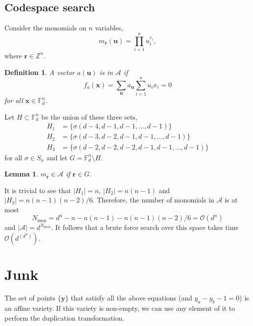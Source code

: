 \documentclass[11pt,a4paper]{article}
\newtheorem{definition}{Definition}
\newtheorem{lemma}{Lemma}
\begin{document}
	\subsection{Codespace search}
	Consider the monomials on $n$ variables,
	\begin{equation}
	m_{\mathbf{r}}(\mathbf{u}) = \prod_{i=1}^{n}u_i^{r_i},
	\end{equation}
	where $\mathbf{r} \in \mathbb{Z}^n$.
	\begin{definition}
		A vector $a(\mathbf{u})$ is in $\mathcal{A}$ if 
		\begin{equation}
		f_a(\mathbf{x}) = \sum_{\mathbf{u}}a_{\mathbf{u}}\sum_{i=1}^{n}u_ix_i = 0
		\end{equation}
		for all $\mathbf{x} \in \mathbb{F}_d^n$.
	\end{definition}		
	Let $H \subset \mathbb{F}_d^n$ be the union of these three sets,
	\begin{align}
	H_1 &= \{\sigma(d-4, d-1, d-1, \dots, d-1)\}\\	
	H_2 &= \{\sigma(d-3, d-2, d-1, d-1, \dots, d-1) \}\\
	H_3 &= \{\sigma(d-2, d-2, d-2, d-1, d-1, \dots, d-1) \}
	\end{align}
	for all $\sigma \in S_n$ and let $G = \mathbb{F}_d^n \setminus H$.
	
	\begin{lemma}
		$m_{\mathbf{r}}\in \mathcal{A}$ if $\mathbf{r} \in G$.
	\end{lemma}

 	It is trivial to see that $|H_1| = n$, $|H_2| = n(n-1)$ and $|H_3| = n(n-1)(n-2)/6$. Therefore, the number of monomials in $\mathcal{A}$ is at most
 	\begin{equation}
 	N_{\mathrm{mon}} = d^n - n - n(n-1) - n(n-1)(n-2)/6 = \mathcal{O}(d^n)
 	\end{equation}
 	and $|\mathcal{A}|=d^{N_{\mathrm{mon}}}$. It follows that a brute force search over this space takes time $\mathcal{O}(d^{(d^n)})$.
 	
 	\section{Junk}
 	The set of points $\{\mathbf{y}\}$ that satisfy all the above equations (and $y_a - y_b - 1 = 0$) is an affine variety. If this variety is non-empty, we can use any element of it to perform the duplication transformation.
 	
\end{document}
